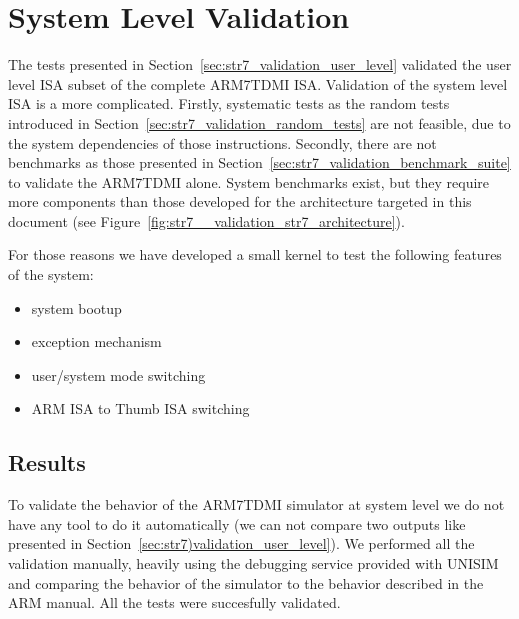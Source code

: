 \section{System Level Validation}
\label{sec:str7_validation_system_level}

The tests presented in Section~\ref{sec:str7_validation_user_level} validated the user level ISA subset of the complete ARM7TDMI ISA.
Validation of the system level ISA is a more complicated.
Firstly, systematic tests as the random tests introduced in Section~\ref{sec:str7_validation_random_tests} are not feasible, due to the system dependencies of those instructions.
Secondly, there are not benchmarks as those presented in Section~\ref{sec:str7_validation_benchmark_suite} to validate the ARM7TDMI alone.
System benchmarks exist, but they require more components than those developed for the architecture targeted in this document (see Figure~\ref{fig:str7__validation_str7_architecture}).

For those reasons we have developed a small kernel to test the following features of the system:
\begin{itemize}
	\item system bootup
	\item exception mechanism
	\item user/system mode switching
	\item ARM ISA to Thumb ISA switching
\end{itemize}

\subsection{Results}
To validate the behavior of the ARM7TDMI simulator at system level we do not have any tool to do it automatically (we can not compare two outputs like presented in Section~\ref{sec:str7)validation_user_level}).
We performed all the validation manually, heavily using the debugging service provided with UNISIM and comparing the behavior of the simulator to the behavior described in the ARM manual.
All the tests were succesfully validated.
